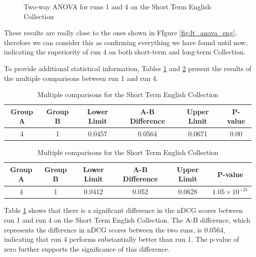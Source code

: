 \begin{figure}[!h]
\begin{subfigure}[b]{0.49\textwidth}
        \label{fig:st_anova_eng_ap}
    \end{subfigure}
    \caption{Two-way ANOVA for runs 1 and 4 on the Short Term English Collection}
    \label{fig:st_anova_eng}
\end{figure}
 
These results are really close to the ones shown in FIgure \ref{fig:lt_anova_eng}, therefore we can consider this as confirming everything we have found until now, indicating the superiority of run 4 on both short-term and long-term Collection.

To provide additional statistical information, Tables \ref{table:st_anova_eng} and \ref{table:st_anova_eng_ap} present the results of the multiple comparisons between run 1 and run 4.

\begin{table}[!h]
    \centering
    \caption{Multiple comparisons for the Short Term English Collection}
    \label{table:st_anova_eng}
    \begin{tabular}{cccccc}
    \hline
    Group A & Group B & Lower Limit & A-B Difference & Upper Limit & P-value \\
    \hline
    4 & 1 & 0.0457 & 0.0564 & 0.0671 & 0.00 \\
    \hline
    \end{tabular}
\end{table}

\begin{table}[!h]
    \centering
    \caption{Multiple comparisons for the Short Term English Collection}
    \label{table:st_anova_eng_ap}
    \begin{tabular}{cccccc}
    \hline
    Group A & Group B & Lower Limit & A-B Difference & Upper Limit & P-value \\
    \hline
    4 & 1 & 0.0412 & 0.052 & 0.0628 & $1.05 \times 10^{-21}$ \\
    \hline
    \end{tabular}
\end{table}

Table \ref{table:st_anova_eng} shows that there is a significant difference in the \ac{nDCG} scores between run 1 and run 4 on the Short Term English Collection. 
The A-B difference, which represents the difference in \ac{nDCG} scores between the two runs, is 0.0564, indicating that run 4 performs substantially better than run 1. 
The p-value of zero further supports the significance of this difference.

